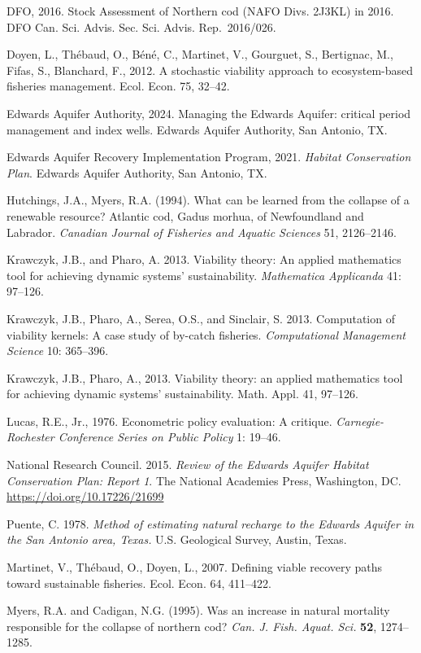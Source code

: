 \documentclass[11pt]{article}
\begin{document}
DFO, 2016. Stock Assessment of Northern cod (NAFO Divs. 2J3KL) in 2016.
DFO Can. Sci. Advis. Sec. Sci. Advis. Rep.~2016/026.

Doyen, L., Th\'ebaud, O., B\'en\'e, C., Martinet, V., Gourguet, S., Bertignac,
M., Fifas, S., Blanchard, F., 2012. A stochastic viability approach to
ecosystem-based fisheries management. Ecol. Econ. 75, 32--42.

Edwards Aquifer Authority, 2024. Managing the Edwards Aquifer: critical period management and
index wells. Edwards Aquifer Authority, San Antonio, TX.

Edwards Aquifer Recovery Implementation Program, 2021. \emph{Habitat Conservation Plan}. Edwards Aquifer Authority, San Antonio, TX.

Hutchings, J.A., Myers, R.A. (1994). What can be learned from the
collapse of a renewable resource? Atlantic cod, Gadus morhua, of
Newfoundland and Labrador. \emph{Canadian Journal of Fisheries and
Aquatic Sciences} 51, 2126--2146.

Krawczyk, J.B., and Pharo, A. 2013. Viability theory: An applied
mathematics tool for achieving dynamic systems' sustainability.
\emph{Mathematica Applicanda} 41: 97--126.

Krawczyk, J.B., Pharo, A., Serea, O.S., and Sinclair, S. 2013.
Computation of viability kernels: A case study of by-catch fisheries.
\emph{Computational Management Science} 10: 365--396.


Krawczyk, J.B., Pharo, A., 2013. Viability theory: an applied
mathematics tool for achieving dynamic systems' sustainability. Math.
Appl. 41, 97--126.

Lucas, R.E., Jr., 1976. Econometric policy evaluation: A critique.
\emph{Carnegie-Rochester Conference Series on Public Policy} 1: 19--46.

National Research Council. 2015. \emph{Review of the Edwards Aquifer
Habitat Conservation Plan: Report 1}. The National Academies Press,
Washington, DC. \url{https://doi.org/10.17226/21699}

Puente, C. 1978. \emph{Method of estimating natural recharge to the
Edwards Aquifer in the San Antonio area, Texas.} U.S. Geological Survey,
Austin, Texas.

Martinet, V., Th\'ebaud, O., Doyen, L., 2007. Defining viable recovery
paths toward sustainable fisheries. Ecol. Econ. 64, 411--422.

Myers, R.A. and Cadigan, N.G. (1995). Was an increase in natural mortality responsible for
the collapse of northern cod? \emph{Can. J. Fish. Aquat. Sci.} \textbf{52}, 1274--1285.
\end{document}
